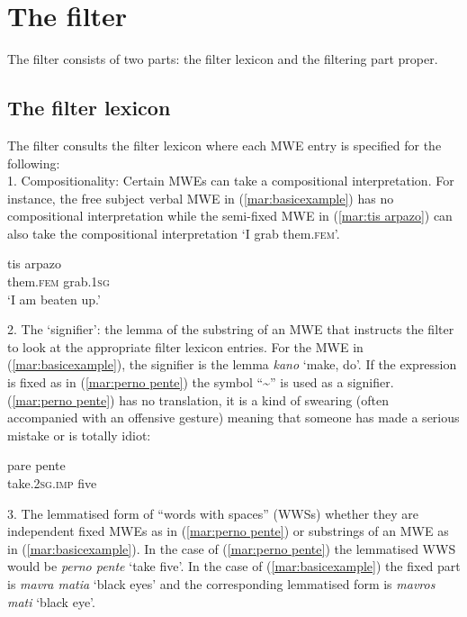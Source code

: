 \documentclass[output=paper]{langsci/langscibook}
\begin{document}
\section{The filter}
Τhe filter consists of two parts: the filter lexicon and the filtering part proper. 

\subsection{The filter lexicon}
The filter consults the filter lexicon where each MWE entry is specified for the following: \\

1. Compositionality: Certain MWEs can take a compositional interpretation. For instance, the free subject verbal MWE in (\ref{mar:basicexample}) has no compositional interpretation while the semi-fixed MWE in (\ref{mar:tis arpazo}) can also take the compositional interpretation `I grab them.\textsc{fem}’. 

\ea\label{mar:tis arpazo}
\gll tis                  arpazo\\
them.\textsc{fem} grab.\textsc{1sg}\\
\glt `I am beaten up.’
\z

2. The ‘signifier’: the lemma of the substring of an MWE that instructs the filter to look at the appropriate filter lexicon entries. For the MWE in (\ref{mar:basicexample}), the signifier is the lemma \textit{kano} `make, do'. If the expression is fixed as in (\ref{mar:perno pente}) the symbol ``\textasciitilde{}'' is used as a signifier.  (\ref{mar:perno pente}) has no translation, it is a kind of swearing (often accompanied with an offensive gesture) meaning that someone has made a serious mistake or is totally idiot:
  
 \ea\label{mar:perno pente}
\gll pare pente\\
take.\textsc{2sg}.\textsc{imp} five\\ 
\z

3. The lemmatised form of  ``words with spaces'' (WWSs) whether they are independent fixed MWEs as in (\ref{mar:perno pente}) or substrings of an MWE as in (\ref{mar:basicexample}). In the case of (\ref{mar:perno pente}) the lemmatised WWS would be \textit{perno pente} `take five'. In the case of (\ref{mar:basicexample}) the fixed part is \textit{mavra matia} `black eyes' and the corresponding lemmatised form is \textit{mavros mati} `black eye'.\\
\end{document}
